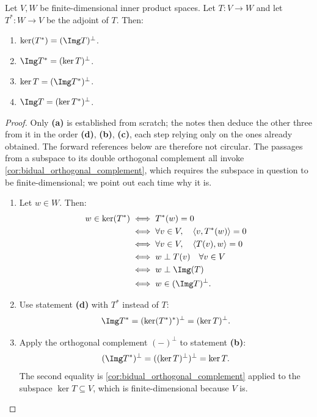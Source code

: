 \begin{lemma}
\label{lem:orthogonal_relations_adjoint_maps}
Let $V, W$ be finite-di\-men\-sional inner product spaces. Let $T \colon V \to W$ and let $T^* \colon W \to V$ be the adjoint of $T$. Then:
\begin{enumerate}[label=\textbf{(\alph*)}]
    \item $\ker(T^*) = (\Img T)^\perp$.
    \item $\Img T^* = (\ker T)^\perp$.
    \item $\ker T = (\Img T^*)^\perp$.
    \item $\Img T = (\ker T^*)^\perp$.
\end{enumerate}
\end{lemma}

\begin{proof}
Only \textbf{(a)} is established from scratch; the notes then deduce the other three from it in the order \textbf{(d)}, \textbf{(b)}, \textbf{(c)}, each step relying only on the ones already obtained. The forward references below are therefore not circular. The passages from a subspace to its double orthogonal complement all invoke \cref{cor:bidual_orthogonal_complement}, which requires the subspace in question to be finite-di\-men\-sional; we point out each time why it is.
\begin{enumerate}[label=\textbf{(\alph*)}]
    \item Let $w \in W$. Then:
    \begin{align*}
        w \in \ker(T^*) &\iff T^*(w) = 0 \\
        &\iff \forall v \in V, \quad \langle v, T^*(w) \rangle = 0 \\
        &\iff \forall v \in V, \quad \langle T(v), w \rangle = 0 \\
        &\iff w \perp T(v) \quad \forall v \in V \\
        &\iff w \perp \Img(T) \\
        &\iff w \in (\Img T)^\perp.
    \end{align*}

    \item Use statement \textbf{(d)} with $T^*$ instead of $T$:
    \[
        \Img T^* = (\ker (T^*)^*)^\perp = (\ker T)^\perp.
    \]

    \item Apply the orthogonal complement $(-)^\perp$ to statement \textbf{(b)}:
    \[
        (\Img T^*)^\perp = ((\ker T)^\perp)^\perp = \ker T.
    \]
    The second equality is \cref{cor:bidual_orthogonal_complement} applied to the subspace $\ker T \subseteq V$, which is finite-di\-men\-sional because $V$ is.


\end{enumerate}
\end{proof}
